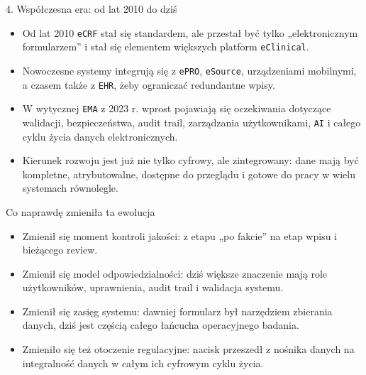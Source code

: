 \begin{frame}{4. Współczesna era: od lat 2010 do dziś}
  \begin{itemize}
    \item Od lat 2010 \texttt{eCRF} stał się standardem, ale przestał być tylko „elektronicznym formularzem” i stał się elementem większych platform \texttt{eClinical}.
    \item Nowoczesne systemy integrują się z \texttt{ePRO}, \texttt{eSource}, urządzeniami mobilnymi, a czasem także z \texttt{EHR}, żeby ograniczać redundantne wpisy.
    \item W wytycznej \texttt{EMA} z 2023 r. wprost pojawiają się oczekiwania dotyczące walidacji, bezpieczeństwa, audit trail, zarządzania użytkownikami, \texttt{AI} i całego cyklu życia danych elektronicznych.
    \item Kierunek rozwoju jest już nie tylko cyfrowy, ale zintegrowany: dane mają być kompletne, atrybutowalne, dostępne do przeglądu i gotowe do pracy w wielu systemach równolegle.
  \end{itemize}
\end{frame}

\begin{frame}{Co naprawdę zmieniła ta ewolucja}
  \begin{itemize}
    \item Zmienił się moment kontroli jakości: z etapu „po fakcie” na etap wpisu i bieżącego review.
    \item Zmienił się model odpowiedzialności: dziś większe znaczenie mają role użytkowników, uprawnienia, audit trail i walidacja systemu.
    \item Zmienił się zasięg systemu: dawniej formularz był narzędziem zbierania danych, dziś jest częścią całego łańcucha operacyjnego badania.
    \item Zmieniło się też otoczenie regulacyjne: nacisk przeszedł z nośnika danych na integralność danych w całym ich cyfrowym cyklu życia.
  \end{itemize}
\end{frame}


